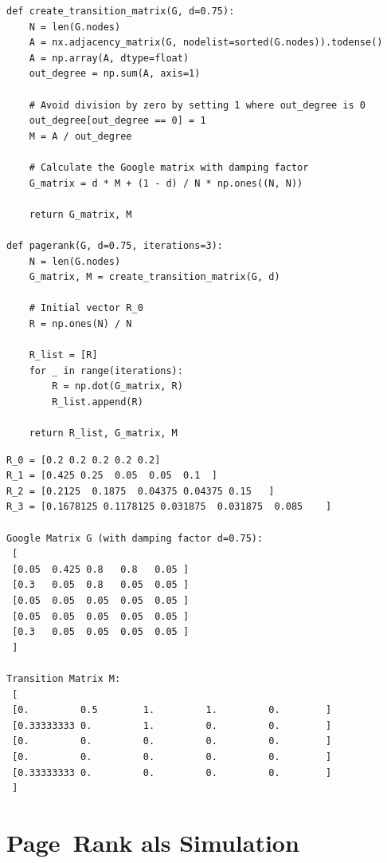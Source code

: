 \documentclass[a4paper,11pt]{report}
\begin{document}
    \begin{verbatim}
def create_transition_matrix(G, d=0.75):
    N = len(G.nodes)
    A = nx.adjacency_matrix(G, nodelist=sorted(G.nodes)).todense()
    A = np.array(A, dtype=float)
    out_degree = np.sum(A, axis=1)

    # Avoid division by zero by setting 1 where out_degree is 0
    out_degree[out_degree == 0] = 1
    M = A / out_degree

    # Calculate the Google matrix with damping factor
    G_matrix = d * M + (1 - d) / N * np.ones((N, N))

    return G_matrix, M

def pagerank(G, d=0.75, iterations=3):
    N = len(G.nodes)
    G_matrix, M = create_transition_matrix(G, d)

    # Initial vector R_0
    R = np.ones(N) / N

    R_list = [R]
    for _ in range(iterations):
        R = np.dot(G_matrix, R)
        R_list.append(R)

    return R_list, G_matrix, M
    \end{verbatim}

    \begin{verbatim}
R_0 = [0.2 0.2 0.2 0.2 0.2]
R_1 = [0.425 0.25  0.05  0.05  0.1  ]
R_2 = [0.2125  0.1875  0.04375 0.04375 0.15   ]
R_3 = [0.1678125 0.1178125 0.031875  0.031875  0.085    ]

Google Matrix G (with damping factor d=0.75):
 [
 [0.05  0.425 0.8   0.8   0.05 ]
 [0.3   0.05  0.8   0.05  0.05 ]
 [0.05  0.05  0.05  0.05  0.05 ]
 [0.05  0.05  0.05  0.05  0.05 ]
 [0.3   0.05  0.05  0.05  0.05 ]
 ]

Transition Matrix M:
 [
 [0.         0.5        1.         1.         0.        ]
 [0.33333333 0.         1.         0.         0.        ]
 [0.         0.         0.         0.         0.        ]
 [0.         0.         0.         0.         0.        ]
 [0.33333333 0.         0.         0.         0.        ]
 ]
    \end{verbatim}


    \newpage

    \chapter[Page Rank als Simulation]{Page~Rank als Simulation}
    \label{ch:pageRankSim}
\end{document}

